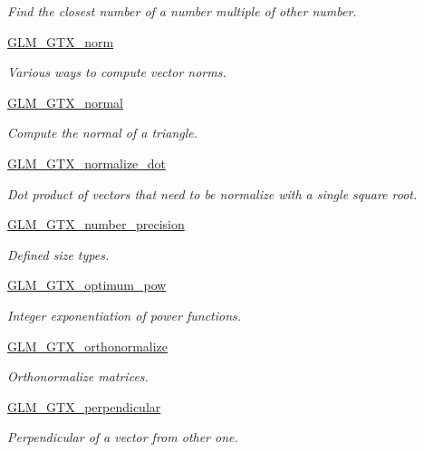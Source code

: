 \begin{DoxyCompactItemize}
\begin{DoxyCompactList}\small\item\em Find the closest number of a number multiple of other number. \end{DoxyCompactList}\item 
\hyperlink{group__gtx__norm}{G\-L\-M\-\_\-\-G\-T\-X\-\_\-norm}
\begin{DoxyCompactList}\small\item\em Various ways to compute vector norms. \end{DoxyCompactList}\item 
\hyperlink{group__gtx__normal}{G\-L\-M\-\_\-\-G\-T\-X\-\_\-normal}
\begin{DoxyCompactList}\small\item\em Compute the normal of a triangle. \end{DoxyCompactList}\item 
\hyperlink{group__gtx__normalize__dot}{G\-L\-M\-\_\-\-G\-T\-X\-\_\-normalize\-\_\-dot}
\begin{DoxyCompactList}\small\item\em Dot product of vectors that need to be normalize with a single square root. \end{DoxyCompactList}\item 
\hyperlink{group__gtx__number__precision}{G\-L\-M\-\_\-\-G\-T\-X\-\_\-number\-\_\-precision}
\begin{DoxyCompactList}\small\item\em Defined size types. \end{DoxyCompactList}\item 
\hyperlink{group__gtx__optimum__pow}{G\-L\-M\-\_\-\-G\-T\-X\-\_\-optimum\-\_\-pow}
\begin{DoxyCompactList}\small\item\em Integer exponentiation of power functions. \end{DoxyCompactList}\item 
\hyperlink{group__gtx__orthonormalize}{G\-L\-M\-\_\-\-G\-T\-X\-\_\-orthonormalize}
\begin{DoxyCompactList}\small\item\em Orthonormalize matrices. \end{DoxyCompactList}\item 
\hyperlink{group__gtx__perpendicular}{G\-L\-M\-\_\-\-G\-T\-X\-\_\-perpendicular}
\begin{DoxyCompactList}\small\item\em Perpendicular of a vector from other one. \end{DoxyCompactList}\item 

\end{DoxyCompactItemize}
